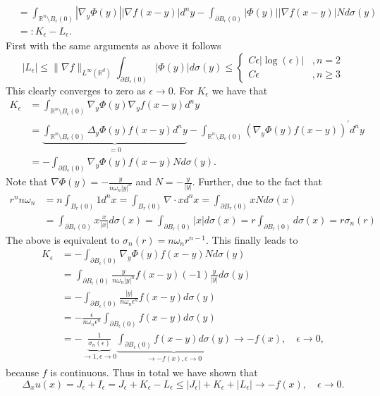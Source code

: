 \documentclass[A4,12pt,twoside]{book}
\begin{document}
{\begin{align*}
    &= \int_{\mathbb{R}^n \setminus B_\epsilon (0)} | \nabla_y \Phi (y)| | \nabla f(x-y) | d^n y - \int_{\partial B_\epsilon (0)} |  \Phi (y)| | \nabla f(x-y) | N d \sigma (y) \\
    &=: K_\epsilon - L_\epsilon.
\end{align*}
First with the same arguments as above it follows
\[
|L_\epsilon| \leq \| \nabla f \|_{L^\infty (\mathbb{R}^d)} \int_{\partial B_\epsilon (0)} |\Phi (y)| d \sigma (y) \leq \begin{cases}
    C \epsilon |\log (\epsilon)| &, n=2\\
    C \epsilon &, n \geq 3
\end{cases}
\]
This clearly converges to zero as $\epsilon \to 0$. For $K_\epsilon$ we have that
\begin{align*}
    K_\epsilon &= \int_{\mathbb{R}^n \setminus B_\epsilon (0)} \nabla_y \Phi (y) \nabla_y f(x-y) d^n y \\
    &= \underbrace{ \int_{\mathbb{R}^n \setminus B_\epsilon (0)} \Delta_y \Phi (y) f(x-y) d^n y }_{=0} - \int_{\mathbb{R}^n \setminus B_\epsilon (0)} (\nabla_y \Phi(y) f(x-y))^\prime d^n y \\
    &= - \int_{\partial B_\epsilon (0)} \nabla_y \Phi(y) f(x-y) N d \sigma( y).
\end{align*}
Note that $\nabla \Phi (y) = - \frac{y}{n \omega_n |y|^n }$ and $N= - \frac{y}{|y|}$. Further, due to the fact that
\begin{align*}
r^n n \omega_n &= n \int_{B_r (0)} 1 d^n x = \int_{B_r (0) } \nabla \cdot x d^n x = \int_{\partial B_r (0)} x N d\sigma (x) \\
&= \int_{\partial B_r (0)} x \frac{x}{|x|} d\sigma (x) = \int_{\partial B_r (0)} |x| d \sigma (x) =r \int_{\partial B_r (0)} d\sigma (x) = r \sigma_n (r)
\end{align*}
The above is equivalent to $\sigma_n (r) = n \omega_n r^{n-1}$. This finally leads to
\begin{align*}
    K_\epsilon &= - \int_{\partial B_\epsilon (0)} \nabla_y \Phi (y) f(x-y) N d \sigma (y) \\
    &=  \int_{\partial B_\epsilon (0)} \frac{y}{n \omega_n |y|^n } f(x-y) (-1)\frac{y}{|y|} d \sigma (y) \\
    &=-  \int_{\partial B_\epsilon (0)} \frac{|y|}{n \omega_n \epsilon^n } f(x-y)  d \sigma (y) \\
    &=-\frac{\epsilon}{n \omega_n \epsilon^n }  \int_{\partial B_\epsilon (0)}  f(x-y)  d \sigma (y) \\
    &=-\underbrace{\frac{1}{\sigma_n (\epsilon)}}_{\to 1, \epsilon \to 0}  \underbrace{\int_{\partial B_\epsilon (0)}  f(x-y)  d \sigma (y)}_{\to -f(x) , \epsilon \to 0} \to - f(x), \quad \epsilon \to 0,
\end{align*}
because $f$ is continuous. Thus in total we have shown that\[
\Delta_x u(x) = J_\epsilon + I_\epsilon = J_\epsilon + K_\epsilon - L_\epsilon \leq |J_\epsilon| + K_\epsilon +| L_\epsilon|  \to -f(x) , \quad \epsilon \to 0.
\]
}
\end{document}
